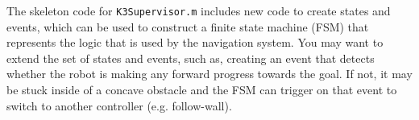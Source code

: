 \documentclass[10pt]{article}
\begin{document}
The skeleton code for \texttt{K3Supervisor.m} includes new code to create states and events, which can be used to construct a finite state machine (FSM) that represents the logic that is used by the navigation system. You may want to extend the set of states and events, such as, creating an event that detects whether the robot is making any forward progress towards the goal. If not, it may be stuck inside of a concave obstacle and the FSM can trigger on that event to switch to another controller (e.g. follow-wall).
\end{document}
